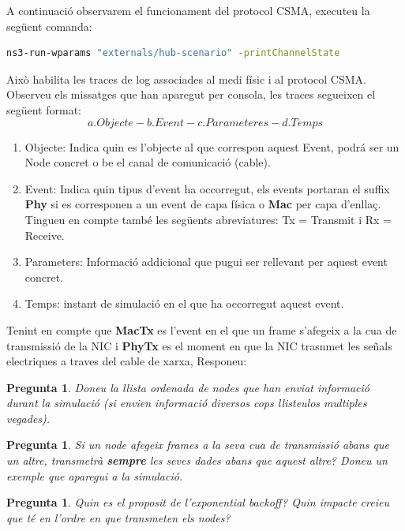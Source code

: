 \documentclass[12pt,a4paper]{article}
\newcounter{exercises}
\newtheorem{exer}[exercises]{Pregunta}
\begin{document}
\begin{enumerate}
A continuació observarem el funcionament del protocol CSMA, executeu la següent comanda:

\begin{lstlisting}[language=bash,basicstyle=\footnotesize]
   ns3-run-wparams "externals/hub-scenario" -printChannelState
\end{lstlisting}
Això habilita les traces de log associades al medi físic i al protocol CSMA. Observeu els missatges que han aparegut per consola, les traces segueixen el següent format:
$$
a. Objecte  - b. Event - c. Parameteres - d. Temps $$

\begin{enumerate}
 \item Objecte: Indica quin es l'objecte al que correspon aquest Event, podrá ser un Node  concret o be el canal de comunicació (cable).
 \item Event: Indica quin tipus d'event ha occorregut, els events portaran el suffix \textbf{Phy} si es corresponen a un event de capa física o \textbf{Mac} per capa d'enllaç. Tingueu en compte també les següents abreviatures: Tx = Transmit i Rx = Receive.
 \item Parameters: Informació addicional que pugui ser rellevant per aquest event concret.
 \item Temps: instant de simulació en el que ha occorregut aquest event.
\end{enumerate}

Tenint en compte que \textbf{MacTx} es l'event en el que un frame s'afegeix a la cua de transmissió de la NIC i \textbf{PhyTx} es el moment en que la NIC trasnmet les señals electriques a traves del cable de 
xarxa, Responeu:
\begin{exer} Doneu la llista ordenada de nodes que han enviat informació durant la simulació (si envien informació diversos cops llisteulos multiples vegades).\end{exer}
\begin{exer} Si un node afegeix frames a la seva cua de transmissió abans que un altre, transmetrà \textbf{sempre} les seves dades abans que aquest altre? Doneu un exemple que aparegui a la simulació.
\end{exer}
\begin{exer} Quin es el proposit de l'exponential backoff? Quin impacte creieu que té en l'ordre en que transmeten els nodes? \end{exer}

\end{enumerate}
\end{document}
